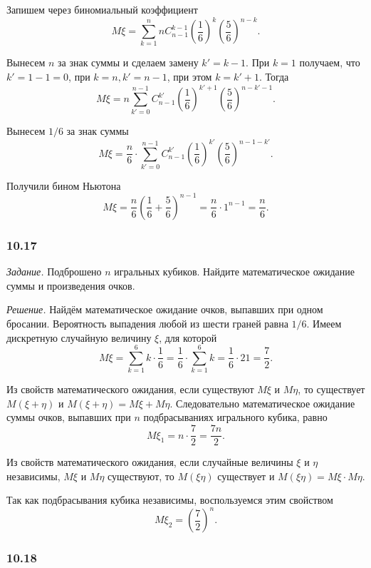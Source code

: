 Запишем через биномиальный коэффициент
$$M \xi =
\sum \limits_{k=1}^n nC_{n-1}^{k-1} \left( \frac{1}{6} \right)^k \left( \frac{5}{6} \right)^{n-k}.$$

Вынесем $n$ за знак суммы и сделаем замену $k' = k - 1$.
При $k = 1$ получаем, что $k' = 1 - 1 = 0$, при $k = n, k' = n - 1$, при этом $k = k' + 1$.
Тогда
$$M \xi =
n \sum \limits_{k'=0}^{n-1} C_{n-1}^{k'} \left( \frac{1}{6} \right)^{k'+1} \left( \frac{5}{6} \right)^{n-k'-1}.$$

Вынесем $1/6$ за знак суммы
$$M \xi =
\frac{n}{6} \cdot \sum \limits_{k'=0}^{n-1} C_{n-1}^{k'} \left( \frac{1}{6} \right)^{k'} \left( \frac{5}{6} \right)^{n-1-k'}.$$

Получили бином Ньютона
$$M \xi =
\frac{n}{6} \left( \frac{1}{6} + \frac{5}{6} \right)^{n-1} =
\frac{n}{6} \cdot 1^{n-1} =
\frac{n}{6}.$$

\subsubsection*{10.17}

\textit{Задание.} Подброшено $n$ игральных кубиков.
Найдите математическое ожидание суммы и произведения очков.

\textit{Решение.} Найдём математическое ожидание очков, выпавших при одном бросании.
Вероятность выпадения любой из шести граней равна $1/6$.
Имеем дискретную случайную величину $ \xi $, для которой
$$M \xi =
\sum \limits_{k=1}^6 k \cdot \frac{1}{6} =
\frac{1}{6} \cdot \sum \limits_{k=1}^6 k =
\frac{1}{6} \cdot 21 =
\frac{7}{2}.$$

Из свойств математического ожидания, если существуют $M \xi $ и $M \eta $, то существует $M \left( \xi + \eta \right) $ и $M \left( \xi + \eta \right) = M \xi + M \eta $.
Следовательно математическое ожидание суммы очков, выпавших при $n$ подбрасываниях игрального кубика, равно
$$M \xi_1 =
n \cdot \frac{7}{2} =
\frac{7n}{2}.$$

Из свойств математического ожидания,
если случайные величины $ \xi $ и $ \eta $ независимы,
$M \xi $ и $M \eta $ существуют, то $M \left( \xi \eta \right) $ существует и $M \left( \xi \eta \right) = M \xi \cdot M \eta $.

Так как подбрасывания кубика независимы, воспользуемся этим свойством
$$M \xi_2 =
\left( \frac{7}{2} \right)^n.$$

\subsubsection*{10.18}

